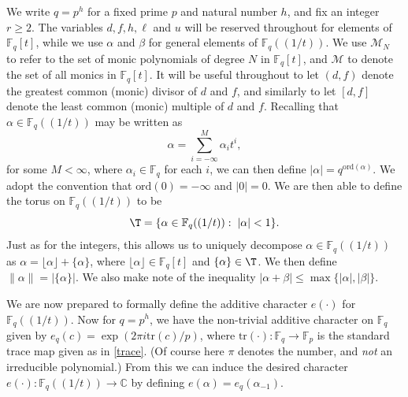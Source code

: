 \documentclass[reqno,11pt]{amsart}
\theoremstyle{definition}
\theoremstyle{remark}
\numberwithin{equation}{section}
\def\calM{{\mathcal M}}
\def\C{{\mathbb C}}\def\F{{\mathbb F}}\def\N{{\mathbb N}}\def\P{{\mathbb P}}
\newcommand{\ord}{\text{ord}}
\newcommand{\tr}{\text{tr}}
\newcommand{\<}{\begin{equation}}
\renewcommand{\>}{\end{equation}}
\begin{document}
We write $q = p^h$ for a  fixed prime $p$ and natural number $h$, and fix an integer $r \geq 2$. The variables $d,f,h,\ell$ and $u$ will be reserved throughout for elements of $\F_q[t]$, while we use $\alpha$ and $\beta$ for general elements of $\F_q((1/t))$. We use $\calM_N$ to refer to the set of monic polynomials of degree $N$ in $\F_q[t]$, and $\calM$ to denote the set of all monics in $\F_q[t]$. It will be useful throughout to let $(d,f)$ denote the greatest common (monic) divisor of $d$ and $f$, and similarly to let $[d,f]$ denote the least common (monic) multiple of $d$ and $f$. Recalling that $\alpha \in \F_q((1/t))$ may be written as
\[\alpha = \sum_{i=-\infty}^M \alpha_it^i,\]
for some $M<\infty$, where $\alpha_i \in \F_q$ for each $i$, we can then define $|\alpha| = q^{\ord(\alpha)}$. We adopt the convention that $\ord(0) = -\infty$ and $|0| = 0$. We are then able to define the torus on $\F_q((1/t))$ to be
\[\T = \{\alpha \in \F_q((1/t)): \; |\alpha|<1\}.\]
Just as for the integers, this allows us to uniquely decompose $\alpha \in \F_q((1/t))$ as $\alpha = \lfloor \alpha \rfloor + \{ \alpha \}$, where $\lfloor \alpha \rfloor \in \F_q[t]$ and $\{ \alpha \} \in \T$. We then define $\|\alpha\| = |\{\alpha\}|$. We also make note of the inequality $|\alpha + \beta| \leq \max\{|\alpha|,|\beta|\}$.

We are now prepared to formally define the additive character $e(\cdot)$ for $\F_q((1/t))$. Now for $q = p^h$, we have the non-trivial additive character on $\F_q$ given by $e_q(c) = \exp(2\pi i\tr(c)/p)$, where $\tr(\cdot):\F_q \rightarrow \F_p$ is the standard trace map given as in \eqref{trace}. (Of course here $\pi$ denotes the number, and \emph{not} an irreducible polynomial.)
From this we can induce the desired character $e(\cdot):\F_q((1/t)) \rightarrow \C$ by defining $e(\alpha) = e_q(\alpha_{-1})$. 
\end{document}
